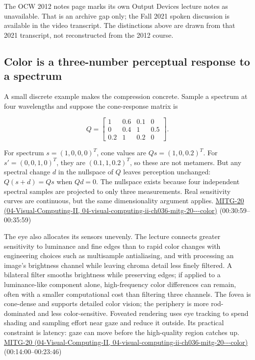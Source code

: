 The OCW 2012 notes page marks its own Output Devices lecture notes as unavailable. That is an archive gap only; the Fall 2021 spoken discussion is available in the video transcript. The distinctions above are drawn from that 2021 transcript, not reconstructed from the 2012 course.

\subsection{Color is a three-number perceptual response to a spectrum}\label{03-visual-computing-i-ch004-color-is-a-three-number-perceptual-response-to-a-spectrum}

A small discrete example makes the compression concrete. Sample a spectrum at four wavelengths and suppose the cone-response matrix is

\[
Q=\begin{bmatrix}1&0.6&0.1&0\\0&0.4&1&0.5\\0.2&1&0.2&0\end{bmatrix}.
\]

For spectrum \(s=(1,0,0,0)^T\), cone values are \(Qs=(1,0,0.2)^T\). For \(s'=(0,0,1,0)^T\), they are \((0.1,1,0.2)^T\), so these are not metamers. But any spectral change \(d\) in the nullspace of \(Q\) leaves perception unchanged: \(Q(s+d)=Qs\) when \(Qd=0\). The nullspace exists because four independent spectral samples are projected to only three measurements. Real sensitivity curves are continuous, but the same dimensionality argument applies. \href{../04-Visual-Computing-II/main.pdf\#nameddest=04-visual-computing-ii-ch036-mitg-20---color}{MITG-20 (04-Visual-Computing-II, 04-visual-computing-ii-ch036-mitg-20-\/-\/-color)} (00:30:59--00:35:59)

The eye also allocates its sensors unevenly. The lecture connects greater sensitivity to luminance and fine edges than to rapid color changes with engineering choices such as multisample antialiasing, and with processing an image's brightness channel while leaving chroma detail less finely filtered. A bilateral filter smooths brightness while preserving edges; if applied to a luminance-like component alone, high-frequency color differences can remain, often with a smaller computational cost than filtering three channels. The fovea is cone-dense and supports detailed color vision; the periphery is more rod-dominated and less color-sensitive. Foveated rendering uses eye tracking to spend shading and sampling effort near gaze and reduce it outside. Its practical constraint is latency: gaze can move before the high-quality region catches up. \href{../04-Visual-Computing-II/main.pdf\#nameddest=04-visual-computing-ii-ch036-mitg-20---color}{MITG-20 (04-Visual-Computing-II, 04-visual-computing-ii-ch036-mitg-20-\/-\/-color)} (00:14:00--00:23:46)

